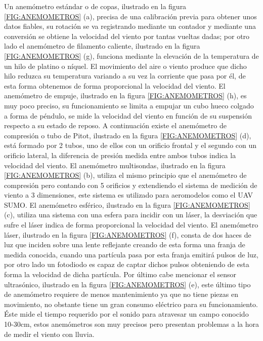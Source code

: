 Un anemómetro estándar o de copas\cite{cupAnemo}, ilustrado en la figura \ref{FIG:ANEMOMETROS} (a), precisa de una calibración previa para obtener unos datos fiables, su rotación se va registrando mediante un contador y mediante una conversión se obtiene la velocidad del viento por tantas vueltas dadas; por otro lado el anemómetro de filamento caliente\cite{hotWireInfoWeb}\cite{hotWireAnem}, ilustrado en la figura \ref{FIG:ANEMOMETROS} (g), funciona mediante la elevación de la temperatura de un hilo de platino o níquel. El movimiento del aire o viento produce que dicho hilo reduzca su temperatura variando a su vez la corriente que pasa por él, de esta forma obtenemos de forma proporcional la velocidad del viento. El anemómetro de empuje\cite{emujeAnem}, ilustrado en la figura \ref{FIG:ANEMOMETROS} (h), es muy poco preciso, su funcionamiento se limita a empujar un cubo hueco colgado a forma de péndulo, se mide la velocidad del viento en función de su suspensión respecto a su estado de reposo. A continuación existe el anemómetro de compresión o tubo de Pitot\cite{Extech}\cite{emujeAnem}, ilustrado en la figura \ref{FIG:ANEMOMETROS} (d), está formado por 2 tubos, uno de ellos con un orificio frontal y el segundo con un orificio lateral, la diferencia de presión medida entre ambos tubos indica la velocidad del viento. El anemómetro multisondas\cite{NASA}\cite{Anemometer2009}, ilustrado en la figura \ref{FIG:ANEMOMETROS} (b), utiliza el mismo principio que el anemómetro de compresión pero contando con 5 orificios y extendiendo el sistema de medición de viento a 3 dimensiones, este sistema es utilizado para aeromodelos como el UAV SUMO. El anemómetro esférico\cite{Holling2007}, ilustrado en la figura \ref{FIG:ANEMOMETROS} (c), utiliza una sistema con una esfera para incidir con un láser, la desviación que sufre el láser indica de forma proporcional la velocidad del viento. El anemómetro láser\cite{Tropea1995}\cite{lasercantilver}\cite{durst1980principles}\cite{albrecht2013laser}, ilustrado en la figura \ref{FIG:ANEMOMETROS} (f), consta de dos haces de luz que inciden sobre una lente reflejante creando de esta forma una franja de medida conocida, cuando una partícula pasa por esta franja emitirá pulsos de luz, por otro lado un fotodiodo es capaz de captar dichos pulsos obteniendo de esta forma la velocidad de dicha partícula. Por último cabe mencionar el sensor ultrasónico\cite{Prudden2016}\cite{Mur2012}, ilustrado en la figura \ref{FIG:ANEMOMETROS} (e), este último tipo de anemómetro requiere de menos mantenimiento ya que no tiene piezas en movimiento, no obstante tiene un gran consumo eléctrico para su funcionamiento. Éste mide el tiempo requerido por el sonido para atravesar un campo conocido 10-30cm, estos anemómetros son muy precisos pero presentan problemas a la hora de medir el viento con lluvia.

